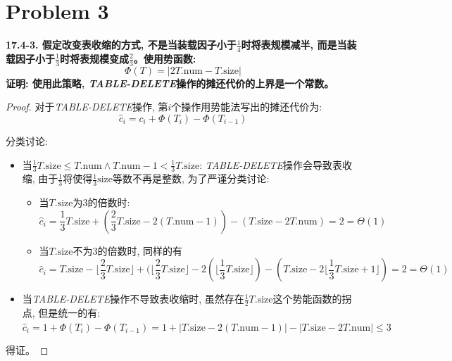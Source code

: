 \documentclass[paper=a4, fontsize=11pt]{scrartcl} %
\numberwithin{equation}{section} %
\numberwithin{figure}{section} %
\numberwithin{table}{section} %
\begin{document}
\section{Problem 3}
\textbf{17.4-3. 假定改变表收缩的方式, 不是当装载因子小于$\frac{1}{4}$时将表规模减半, 而是当装载因子小于$\frac{1}{3}$时将表规模变成$\frac{2}{3}$。使用势函数:}
\[
\Phi(T) = | 2 T.\mbox{num} - T.\mbox{size} |
\]
\textbf{证明: 使用此策略, \textit{TABLE-DELETE}操作的摊还代价的上界是一个常数。}

\begin{proof}
  对于\textit{TABLE-DELETE}操作, 第$i$个操作用势能法写出的摊还代价为:
  \[
  \hat{c}_i = c_i + \Phi(T_i) - \Phi(T_{i-1})
  \]

  分类讨论:
  \begin{itemize}
  \item 当$\frac{1}{3} T.\mbox{size} \leq T.\mbox{num} \land T.\mbox{num} - 1 < \frac{1}{3}T.\mbox{size}$: \textit{TABLE-DELETE}操作会导致表收缩, 由于$\frac{1}{3}$将使得$\frac{1}{3}\mbox{size}$等数不再是整数, 为了严谨分类讨论:
    \begin{itemize}
    \item 当$T.\mbox{size}$为3的倍数时:
      \[
      \hat{c}_i = \frac{1}{3}T.\mbox{size} + (\frac{2}{3}T.\mbox{size} - 2(T.\mbox{num} - 1)) - (T.\mbox{size} - 2 T.\mbox{num}) = 2 = \Theta(1)
      \]
    \item 当$T.\mbox{size}$不为3的倍数时, 同样的有
      \[
      \hat{c}_i = T.\mbox{size} - \lfloor \frac{2}{3} T.\mbox{size} \rfloor + (\lfloor \frac{2}{3}T.\mbox{size} \rfloor - 2(\lfloor \frac{1}{3}T.\mbox{size} \rfloor) - (T.\mbox{size} - 2 \lfloor \frac{1}{3}T.\mbox{size} + 1 \rfloor) = 2 = \Theta(1)
      \]
    \end{itemize}
  \item 当\textit{TABLE-DELETE}操作不导致表收缩时, 虽然存在$\frac{1}{2}T.\mbox{size}$这个势能函数的拐点, 但是统一的有: $\hat{c}_i = 1 + \Phi(T_i) - \Phi(T_{i-1}) = 1 + |T.\mbox{size} - 2 (T.\mbox{num} - 1)| - |T.\mbox{size} - 2 T.\mbox{num}| \leq 3$
  \end{itemize}
  得证。
\end{proof}
\end{document}
